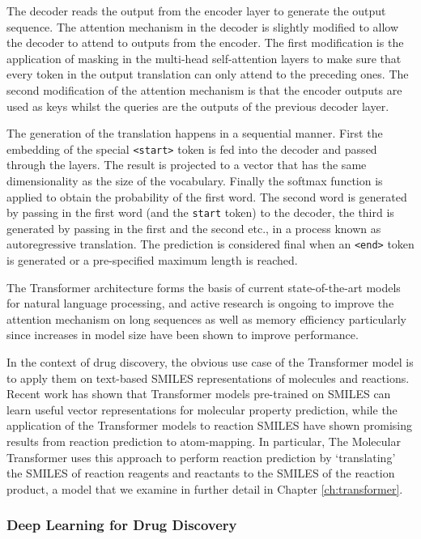 The decoder reads the output from the encoder layer to generate the output sequence. The attention mechanism in the decoder is slightly modified to allow the decoder to attend to outputs from the encoder. The first modification is the application of masking in the multi-head self-attention layers to make sure that every token in the output translation can only attend to the preceding ones. The second modification of the attention mechanism is that the encoder outputs are used as keys whilst the queries are the outputs of the previous decoder layer. 

The generation of the translation happens in a sequential manner. First the embedding of the special \texttt{<start>} token is fed into the decoder and passed through the layers. The result is projected to a vector that has the same dimensionality as the size of the vocabulary. Finally the softmax function is applied to obtain the probability of the first word. The second word is generated by passing in the first word (and the \texttt{start} token) to the decoder, the third is generated by passing in the first and the second etc., in a process known as autoregressive translation. The prediction is considered final when an \texttt{<end>} token is generated or a pre-specified maximum length is reached.

The Transformer architecture forms the basis of current state-of-the-art models for natural language processing, and active research is ongoing to improve the attention mechanism on long sequences as well as memory efficiency particularly since increases in model size have been shown to improve performance.

In the context of drug discovery, the obvious use case of the Transformer model is to apply them on text-based SMILES representations of molecules and reactions. Recent work has shown that Transformer models pre-trained on SMILES can learn useful vector representations for molecular property prediction, while the application of the Transformer models to reaction SMILES have shown promising results from reaction prediction to atom-mapping. In particular, The Molecular Transformer \cite{Schwaller2019MolecularPrediction} uses this approach to perform reaction prediction by `translating' the SMILES of reaction reagents and reactants to the SMILES of the reaction product, a model that we examine in further detail in Chapter \ref{ch:transformer}.

\subsubsection{Deep Learning for Drug Discovery}

